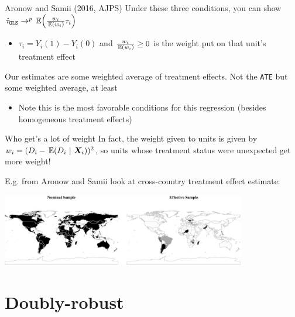 \documentclass[aspectratio=169,t,11pt,table]{beamer}
\begin{document}
\begin{frame}{Aronow and Samii (2016, AJPS)}
  Under these three conditions, you can show $\hat{\tau}_{\texttt{OLS}} \to^p \expec{\frac{w_i}{\expec{w_i}} \tau_i}$
  \begin{itemize}
    \item $\tau_i = Y_i(1) - Y_i(0)$ and $\frac{w_i}{\expec{w_i}} \geq 0$ is the weight put on that unit's treatment effect
  \end{itemize}

  Our estimates are some weighted average of treatment effects. Not the \texttt{ATE} but some weighted average, at least
  \begin{itemize}
    \item Note this is the most favorable conditions for this regression (besides homogeneous treatment effects)
  \end{itemize}
\end{frame}

\begin{frame}{Who get's a lot of weight}
  In fact, the weight given to units is given by $w_i = (D_i - \expec{D_i}{\bm{X}_i})^2$, so units whose treatment status were unexpected get more weight!

  \pause
  E.g. from Aronow and Samii look at cross-country treatment effect estimate:
  \begin{center}  
    \includegraphics[width = 0.8\textwidth]{figures/arronow_samii_2016.jpeg}
  \end{center}
\end{frame}



\section{Doubly-robust}
\end{document}
